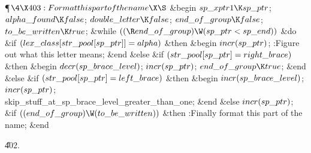 \Y\P$\4\X403:Format this part of the name\X\S$\6
\&{begin} $\\{sp\_xptr1}\K\\{sp\_ptr}$;\5
$\\{alpha\_found}\K\\{false}$;\5
$\\{double\_letter}\K\\{false}$;\5
$\\{end\_of\_group}\K\\{false}$;\5
$\\{to\_be\_written}\K\\{true}$;\6
\&{while} $((\R\\{end\_of\_group})\W(\\{sp\_ptr}<\\{sp\_end}))$ \1\&{do}\6
\&{if} $(\\{lex\_class}[\\{str\_pool}[\\{sp\_ptr}]]=\\{alpha})$ \1\&{then}\6
\&{begin} $\\{incr}(\\{sp\_ptr})$;\5
:Figure out what this letter means\X;\6
\&{end}\6
\4\&{else} \&{if} $(\\{str\_pool}[\\{sp\_ptr}]=\\{right\_brace})$ \1\&{then}\6
\&{begin} $\\{decr}(\\{sp\_brace\_level})$;\5
$\\{incr}(\\{sp\_ptr})$;\5
$\\{end\_of\_group}\K\\{true}$;\6
\&{end}\6
\4\&{else} \&{if} $(\\{str\_pool}[\\{sp\_ptr}]=\\{left\_brace})$ \1\&{then}\6
\&{begin} $\\{incr}(\\{sp\_brace\_level})$;\5
$\\{incr}(\\{sp\_ptr})$;\5
\\{skip\_stuff\_at\_sp\_brace\_level\_greater\_than\_one};\6
\&{end}\6
\4\&{else} $\\{incr}(\\{sp\_ptr})$;\2\2\2\2\6
\&{if} $((\\{end\_of\_group})\W(\\{to\_be\_written}))$ \1\&{then}\6
:Finally format this part of the name\X;\2\6
\&{end}\par
\U402.\fi

